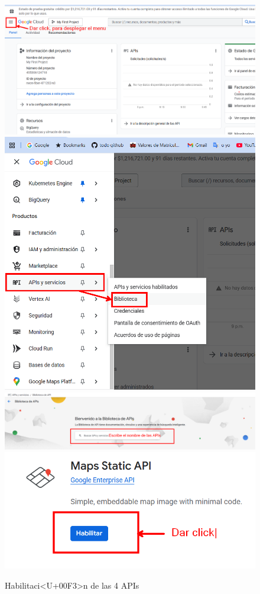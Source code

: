 \documentclass[
]{book}
\begin{document}
\begin{figure}

{\centering \includegraphics[width=0.7\linewidth]{images/gcp5} \includegraphics[width=0.7\linewidth]{images/gcp6} \includegraphics[width=0.7\linewidth]{images/gcp7} \includegraphics[width=0.7\linewidth]{images/gcp8} 

}

\caption{Habilitaci<U+00F3>n de las 4 APIs}\label{fig:gcp1-fig}
\end{figure}
\end{document}

